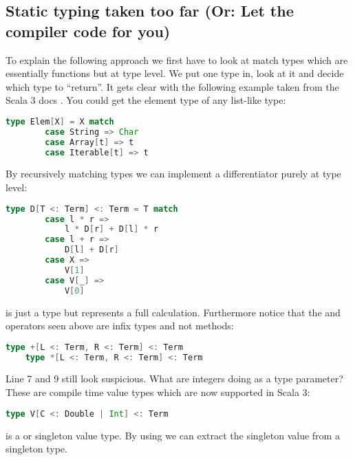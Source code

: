 \subsection{Static typing taken too far (Or: Let the compiler code for you)}
To explain the following approach we first have to look at match types which are essentially functions but at type level. We put one type in, look at it and decide which type to ``return''. It gets clear with the following example taken from the Scala 3 docs \cite{matchTypesScala3}. You could get the element type of any list-like type:
\begin{lstlisting}[language=scala]
    type Elem[X] = X match
        case String => Char
        case Array[t] => t
        case Iterable[t] => t
\end{lstlisting}
By recursively matching types we can implement a differentiator purely at type level:
\begin{lstlisting}[language=scala]
    type D[T <: Term] <: Term = T match
        case l * r => 
            l * D[r] + D[l] * r
        case l + r => 
            D[l] + D[r]
        case X => 
            V[1]
        case V[_] => 
            V[0]
\end{lstlisting}
 is just a type but represents a full calculation. Furthermore notice that the \lstscalainline{*} and \lstscalainline{+} operators seen above are infix types and not methods: 
\begin{lstlisting}[language=scala]
    type +[L <: Term, R <: Term] <: Term
    type *[L <: Term, R <: Term] <: Term
\end{lstlisting}
Line 7 and 9 still look suspicious. What are integers doing as a type parameter? These are compile time value types which are now supported in Scala 3:
\begin{lstlisting}[language=scala]
    type V[C <: Double | Int] <: Term
\end{lstlisting}
 is a  or  singleton value type. By using  we can extract the singleton value from a singleton type. 

